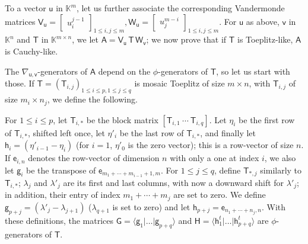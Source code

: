 \documentclass[sigconf]{acmart}
\newcommand{\ve}{\ensuremath{\mathsf{e}}}
\newcommand{\vg}{\ensuremath{\mathsf{g}}}
\newcommand{\vh}{\ensuremath{\mathsf{h}}}
\newcommand{\vu}{\ensuremath{\mathsf{u}}}
\newcommand{\vv}{\ensuremath{\mathsf{v}}}
\newcommand{\mA}{\ensuremath{\mathsf{A}}}
\newcommand{\mG}{\ensuremath{\mathsf{G}}}
\newcommand{\mH}{\ensuremath{\mathsf{H}}}
\newcommand{\mT}{\ensuremath{\mathsf{T}}}
\newcommand{\mV}{\ensuremath{\mathsf{V}}}
\newcommand{\mW}{\ensuremath{\mathsf{W}}}
\newcommand{\K}{\ensuremath{\mathbb{K}}}
\theoremstyle{acmdefinition}
\begin{document}
To a vector $\vu$ in $\K^m$, let us further associate the
corresponding Vandermonde matrices
$
\mV_\vu = \left[\begin{smallmatrix}
u_i^{j-1}
\end{smallmatrix}\right]_{1 \leq i,j \leq m},
\mW_\vu = \left[\begin{smallmatrix}
u_j^{m-i}
\end{smallmatrix}\right]_{1 \leq i,j \leq m}.
$
%
For $\vu$ as above, $\vv$ in $\K^n$ and $\mT$ in $\K^{m\times n}$, we
let $\mA = \mV_\vu\, \mT\, \mW_\vv$; we now prove that if $\mT$ is
Toeplitz-like, $\mA$ is Cauchy-like.

The $\nabla_{\vu,\vv}$-generators of $\mA$ depend on the
$\phi$-generators of $\mT$, so let us start with those. If
$\mT=(\mT_{i,j})_{1 \le i \le p,1 \le j \le q}$ is mosaic Toeplitz of
size $m \times n$, with $\mT_{i,j}$ of size $m_i \times n_j$, we
define the following.

 For $1 \le i \le p$, let $\mT_{i,*}$ be the block matrix
  $[\mT_{i,1}~\cdots~\mT_{i,q}]$.  Let $\eta_i$ be the first row of
  $\mT_{i,*}$, shifted left once, let $\eta'_i$ be the last row of
  $\mT_{i,*}$, and finally let $\vh_i=(\eta'_{i-1}-\eta_i)$ (for
  $i=1$, $\eta'_0$ is the zero vector); this is a row-vector of size
  $n$. If $\ve_{i,n}$ denotes the row-vector of dimension $n$ with
  only a one at index $i$, we also let $\vg_{i}$ be the transpose of
  $\ve_{m_1 + \cdots +m_{i-1}+1,m}$.
For $1 \le j \le q$, define $\mT_{*,j}$ similarly to $\mT_{i,*}$;
 $\lambda_j$ and $\lambda'_j$ are its first and last columns, with now
 a downward shift for $\lambda'_j$; in addition, their entry of index
 $m_1 + \cdots + m_j$ are set to zero. We define
 $\vg_{p+j}=(\lambda'_{j}-\lambda_{j+1})$ ($\lambda_{q+1}$ is set to
 zero) and let $\vh_{p+j}=\ve_{n_1 + \cdots +n_j,n}$.  With
 these definitions,  the matrices $\mG=\langle \vg_1
 | \dots | \vg_{p+q} \rangle$ and $\mH= \langle\vh^t_1 | \dots |
 \vh^t_{p+q} \rangle$ are $\phi$-generators of $\mT$.
\end{document}
